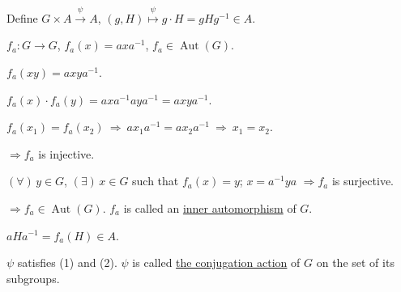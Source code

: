 \noindent Define $G\times A\xrightarrow{\ \psi\ }A$,
\quad $(g,H)\overset{\psi}{\longmapsto}g\cdot H=gHg^{-1}\in A$.

\bigskip
\noindent $f_a:G\longrightarrow G$, \quad $f_a(x)=axa^{-1}$,
\quad $f_a\in\operatorname{Aut}(G)$.

\bigskip
\noindent $f_a(xy)=axya^{-1}$.

\noindent $f_a(x)\cdot f_a(y)=axa^{-1}aya^{-1}=axya^{-1}$.

\bigskip
\noindent $f_a(x_1)=f_a(x_2)\ \Longrightarrow\ ax_1a^{-1}=ax_2a^{-1}
\ \Longrightarrow\ x_1=x_2$.

\noindent $\Longrightarrow f_a$ is injective.

\medskip
\noindent $(\forall)\,y\in G$, $(\exists)\,x\in G$ such that $f_a(x)=y$;
\quad $x=a^{-1}ya$ $\Longrightarrow f_a$ is surjective.

\bigskip
\noindent $\Longrightarrow f_a\in\operatorname{Aut}(G)$.
\quad $f_a$ is called an \underline{inner automorphism} of $G$.

\bigskip
\noindent $aHa^{-1}=f_a(H)\in A$.

\bigskip
\noindent $\psi$ satisfies (1) and (2). $\psi$ is called
\underline{the conjugation action} of $G$ on the set of its subgroups.
